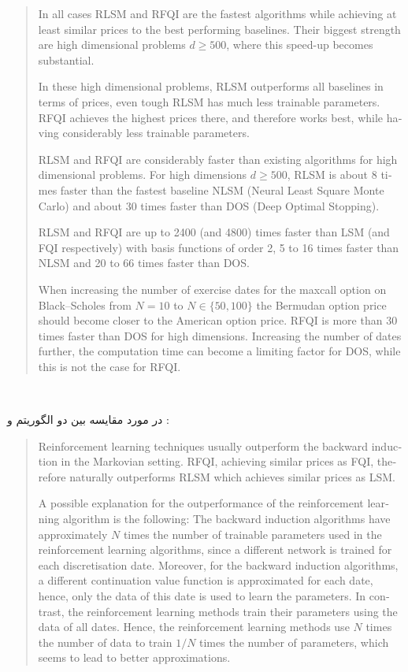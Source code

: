 \documentclass[hidelinks, 11pt]{article}
\begin{document}
\begin{latin}
  \begin{quote}
    In all cases RLSM and RFQI are the fastest algorithms while
    achieving at least similar prices to the best performing
    baselines. Their biggest strength are high dimensional problems
    \(d\geq 500\), where this speed-up becomes substantial.

    In these high dimensional problems, RLSM outperforms all baselines
    in terms of prices, even tough RLSM has much less trainable
    parameters.  RFQI achieves the highest prices there, and therefore
    works best, while having considerably less trainable parameters.

    RLSM and RFQI are considerably faster than existing algorithms for
    high dimensional problems.  For high dimensions \(d\geq 500\), RLSM
    is about 8 times faster than the fastest baseline NLSM (Neural Least
    Square Monte Carlo) and about 30 times faster than DOS (Deep Optimal
    Stopping).

    RLSM and RFQI are up to 2400 (and 4800) times faster than LSM (and
    FQI respectively) with basis functions of order 2, 5 to 16 times
    faster than NLSM and 20 to 66 times faster than DOS.

    When increasing the number of exercise dates for the maxcall option
    on Black–Scholes from \(N=10\) to \(N\in\{50,100\}\) the Bermudan
    option price should become closer to the American option price.
    RFQI is more than 30 times faster than DOS for high dimensions.
    Increasing the number of dates further, the computation time can
    become a limiting factor for DOS, while this is not the case for
    RFQI.
  \end{quote}
\end{latin}

‬\pagebreak

در مورد مقایسه بین دو الگوریتم  و :

\begin{latin}
  \begin{quote}
    Reinforcement learning techniques usually outperform the backward
    induction in the Markovian setting.  RFQI, achieving similar prices
    as FQI, therefore naturally outperforms RLSM which achieves similar
    prices as LSM.

    A possible explanation for the outperformance of the reinforcement
    learning algorithm is the following: The backward induction
    algorithms have approximately \(N\) times the number of trainable
    parameters used in the reinforcement learning algorithms, since a
    different network is trained for each discretisation date.
    Moreover, for the backward induction algorithms, a different
    continuation value function is approximated for each date, hence,
    only the data of this date is used to learn the parameters.  In
    contrast, the reinforcement learning methods train their parameters
    using the data of all dates.  Hence, the reinforcement learning
    methods use \(N\) times the number of data to train \(1/N\) times
    the number of parameters, which seems to lead to better
    approximations.
  \end{quote}
\end{latin}
\end{document}
